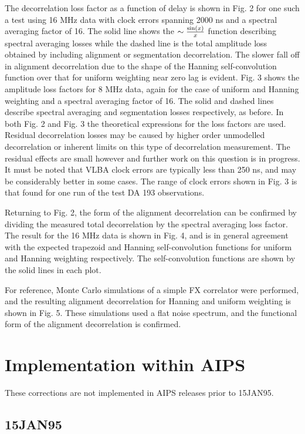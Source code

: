 The decorrelation loss factor as a function of delay is shown in
Fig. 2 for one such a test using 16 MHz data with clock errors
spanning 2000 ns and a spectral averaging factor of 16. The solid line
shows the $\sim {{\sin(x)}\over{x}}$ function describing spectral
averaging losses while the dashed line is the total amplitude loss
obtained by including alignment or segmentation decorrelation.  The
slower fall off in alignment decorrelation due to the shape of the
Hanning self-convolution function over that for uniform weighting near
zero lag is evident. Fig. 3 shows the amplitude loss factors for 8 MHz
data, again for the case of uniform and Hanning weighting and a
spectral averaging factor of 16. The solid and dashed lines describe
spectral averaging and segmentation losses respectively, as before. In
both Fig. 2 and Fig. 3 the theoretical expressions for the loss
factors are used. Residual decorrelation losses may be caused by
higher order unmodelled decorrelation or inherent limits on this type
of decorrelation measurement. The residual effects are small however
and further work on this question is in progress. It must be noted
that VLBA clock errors are typically less than 250 ns, and may be
considerably better in some cases. The range of clock errors shown in
Fig. 3 is that found for one run of the test DA 193 observations.

Returning to Fig. 2, the form of the alignment decorrelation can be
confirmed by dividing the measured total decorrelation by the
spectral averaging loss factor. The result for the 16 MHz data is
shown in Fig. 4, and is in general agreement with the expected
trapezoid and Hanning self-convolution functions for uniform and
Hanning weighting respectively. The self-convolution functions are
shown by the solid lines in each plot.

For reference, Monte Carlo simulations of a simple FX correlator were
performed, and the resulting alignment decorrelation for Hanning and
uniform weighting is shown in Fig. 5. These simulations used a flat
noise spectrum, and the functional form of the alignment decorrelation
is confirmed.

\section{Implementation within AIPS}

These corrections are not implemented in AIPS releases prior to
15JAN95.

\subsection{15JAN95}

